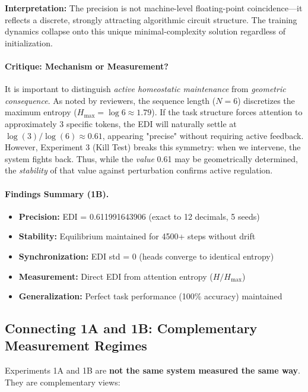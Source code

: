 \textbf{Interpretation:} The precision is not machine-level floating-point coincidence—it reflects a discrete, strongly attracting algorithmic circuit structure. The training dynamics collapse onto this unique minimal-complexity solution regardless of initialization.

\paragraph{Critique: Mechanism or Measurement?}
It is important to distinguish \emph{active homeostatic maintenance} from \emph{geometric consequence}. As noted by reviewers, the sequence length ($N=6$) discretizes the maximum entropy ($H_{\text{max}} = \log 6 \approx 1.79$). If the task structure forces attention to approximately 3 specific tokens, the EDI will naturally settle at $\log(3)/\log(6) \approx 0.61$, appearing "precise" without requiring active feedback. However, Experiment 3 (Kill Test) breaks this symmetry: when we intervene, the system fights back. Thus, while the \emph{value} 0.61 may be geometrically determined, the \emph{stability} of that value against perturbation confirms active regulation.

\paragraph{Findings Summary (1B).}
\begin{itemize}
\item \textbf{Precision:} EDI = 0.611991643906 (exact to 12 decimals, 5 seeds)
\item \textbf{Stability:} Equilibrium maintained for 4500+ steps without drift
\item \textbf{Synchronization:} EDI std = 0 (heads converge to identical entropy)
\item \textbf{Measurement:} Direct EDI from attention entropy ($H/H_{\text{max}}$)
\item \textbf{Generalization:} Perfect task performance (100\% accuracy) maintained
\end{itemize}

\subsection{Connecting 1A and 1B: Complementary Measurement Regimes}

Experiments 1A and 1B are \textbf{not the same system measured the same way}. They are complementary views:

